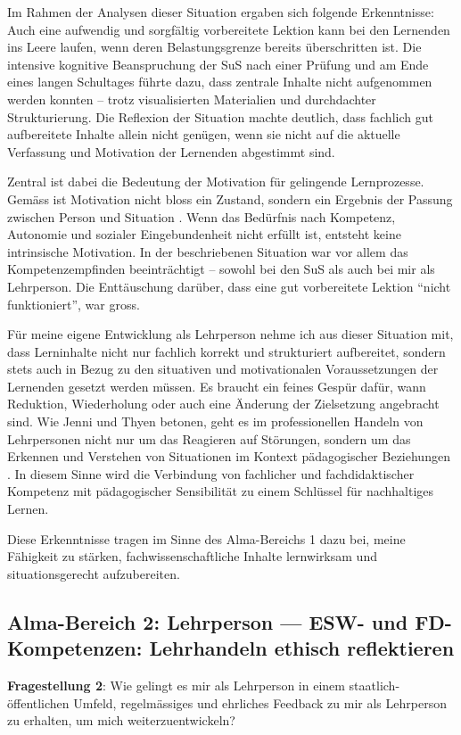\begin{myExBox}[title=Beispiel aus der eigenen Unterrichtserfahrung]
\end{myExBox}

Im Rahmen der Analysen dieser Situation ergaben sich folgende Erkenntnisse: Auch eine aufwendig und sorgfältig vorbereitete Lektion kann bei den Lernenden ins Leere laufen, wenn deren Belastungsgrenze bereits überschritten ist. Die intensive kognitive Beanspruchung der SuS nach einer Prüfung und am Ende eines langen Schultages führte dazu, dass zentrale Inhalte nicht aufgenommen werden konnten -- trotz visualisierten Materialien und durchdachter Strukturierung. Die Reflexion der Situation machte deutlich, dass fachlich gut aufbereitete Inhalte allein nicht genügen, wenn sie nicht auf die aktuelle Verfassung und Motivation der Lernenden abgestimmt sind.

Zentral ist dabei die Bedeutung der Motivation für gelingende Lernprozesse. Gemäss \textcite{ryan, deci} ist Motivation nicht bloss ein Zustand, sondern ein Ergebnis der Passung zwischen Person und Situation \cite{ryan, deci, moeller}. Wenn das Bedürfnis nach Kompetenz, Autonomie und sozialer Eingebundenheit nicht erfüllt ist, entsteht keine intrinsische Motivation. In der beschriebenen Situation war vor allem das Kompetenzempfinden beeinträchtigt -- sowohl bei den SuS als auch bei mir als Lehrperson. Die Enttäuschung darüber, dass eine gut vorbereitete Lektion \enquote{nicht funktioniert}, war gross.

Für meine eigene Entwicklung als Lehrperson nehme ich aus dieser Situation mit, dass Lerninhalte nicht nur fachlich korrekt und strukturiert aufbereitet, sondern stets auch in Bezug zu den situativen und motivationalen Voraussetzungen der Lernenden gesetzt werden müssen. Es braucht ein feines Gespür dafür, wann Reduktion, Wiederholung oder auch eine Änderung der Zielsetzung angebracht sind. Wie Jenni und Thyen betonen, geht es im professionellen Handeln von Lehrpersonen nicht nur um das Reagieren auf Störungen, sondern um das Erkennen und Verstehen von Situationen im Kontext pädagogischer Beziehungen \cite{jenni,thyen}. In diesem Sinne wird die Verbindung von fachlicher und fachdidaktischer Kompetenz mit pädagogischer Sensibilität zu einem Schlüssel für nachhaltiges Lernen.

Diese Erkenntnisse tragen im Sinne des Alma-Bereichs 1 dazu bei, meine Fähigkeit zu stärken, fachwissenschaftliche Inhalte lernwirksam und situationsgerecht aufzubereiten.


\subsection{Alma-Bereich 2: Lehrperson --- ESW- und FD-Kompetenzen: Lehrhandeln ethisch reflektieren}
\textbf{Fragestellung 2}: Wie gelingt es mir als Lehrperson in einem staatlich-öffentlichen Umfeld, regelmässiges und ehrliches Feedback zu mir als Lehrperson zu erhalten, um mich weiterzuentwickeln?

